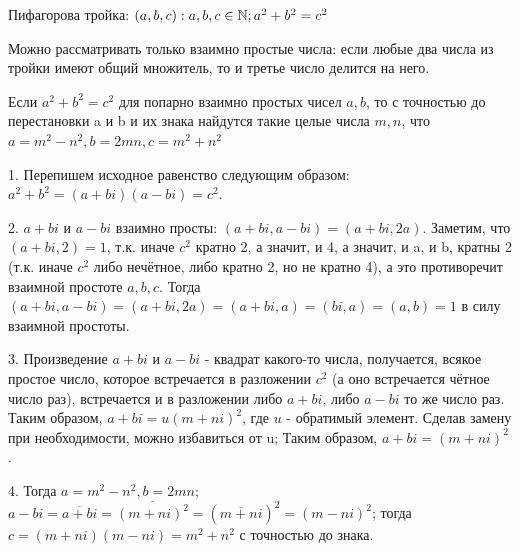 \Def Пифагорова тройка: $(a, b, c): a, b, c \in \mathbb{N}; a^2 + b^2 = c^2$

\Note Можно рассматривать только взаимно простые числа: если любые два числа из тройки имеют общий множитель, то и третье число делится на него.

\Th 
Если $a^2 + b^2 = c^2$ для попарно взаимно простых чисел $a, b$, то с точностью до перестановки a и b и их знака найдутся такие целые числа $m, n$, что $a = m^2 - n^2, b = 2mn, c = m^2 + n^2$

\Proof

1. Перепишем исходное равенство следующим образом: $a^2 + b^2 = (a+bi)(a-bi) = c^2$. 

2. $a+bi$ и $a - bi$ взаимно просты: $(a+bi, a-bi) = (a+bi, 2a)$. Заметим, что $(a + bi, 2) = 1$, т.к. иначе $c^2$ кратно 2, а значит, и 4, а значит, и a, и b, кратны 2 (т.к. иначе $c^2$ либо нечётное, либо кратно 2, но не кратно 4), а это противоречит взаимной простоте $a, b, c$. Тогда $(a+bi, a-bi) = (a+bi, 2a) = (a+bi, a) = (bi, a) = (a, b) = 1$ в силу взаимной простоты.

3. Произведение $a+bi$ и $a - bi$ - квадрат какого-то числа, получается, всякое простое число, которое встречается в разложении $c^2$ (а оно встречается чётное число раз), встречается и в разложении либо $a + bi$, либо $a-bi$ то же число раз. Таким образом, $a + bi = u(m + ni)^2$, где $u$ - обратимый элемент. Сделав замену при необходимости, можно избавиться от u; Таким образом, $a + bi = (m + ni)^2$.

4. Тогда $a = m^2 - n^2, b = 2mn$; $a - bi = \overline{a + bi} = \overline{(m + ni)^2} = (\overline{m + ni})^2 = (m - ni)^2$; тогда $c = (m + ni)(m - ni) = m^2 + n^2$ с точностью до знака.
\EndProof